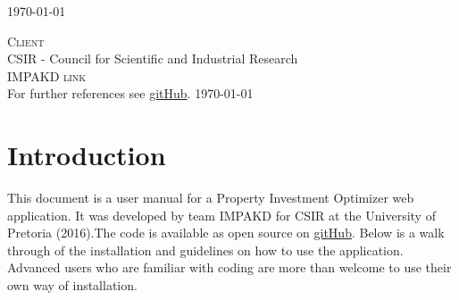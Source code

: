 \documentclass[a4paper,12pt]{article}
\begin{document}
\begin{titlepage}
\begin{center}
\begin{minipage}{0.4\textwidth}
\begin{flushright}
\end{flushright}
\end{minipage}


{\large \today}
\end{center}
\end{titlepage}
\renewcommand{\thesection}{\arabic{section}}

\newpage
\begin{center}
\textsc{\Large Client}\\[0.5cm]
CSIR - Council for Scientific and Industrial Research\\[0.5cm]
\textsc{\Large IMPAKD link}\\[0.5cm]
For further references see \href{https://github.com/u13278012/IMPAKD/}{gitHub}.
\today
\end{center}
\newpage
\tableofcontents{}

\newpage 
\section{Introduction}
This document is a user manual for a Property Investment Optimizer web application. It was developed by team IMPAKD for CSIR at the University of Pretoria (2016).The code is available as open source on \href{https://github.com/u13278012/IMPAKD/}{gitHub}. Below is a walk through of the installation and guidelines on how to use the application. Advanced users who are familiar with coding are more than welcome to use their own way of installation. 
\end{document}

